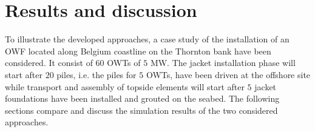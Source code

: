 \section{Results and discussion}
\label{results}
To illustrate the developed approaches, a case study of the installation of an OWF located along Belgium coastline on the Thornton bank have been considered. It consist of $60$ OWTs of $5$ MW.
The jacket installation phase will start after $20$ piles, i.e. the piles for $5$ OWTs, have been driven at the offshore site while transport and assembly of topside elements will start after $5$ jacket foundations have been installed and grouted on the seabed.
The following sections compare and discuss the simulation results of the two considered approaches.